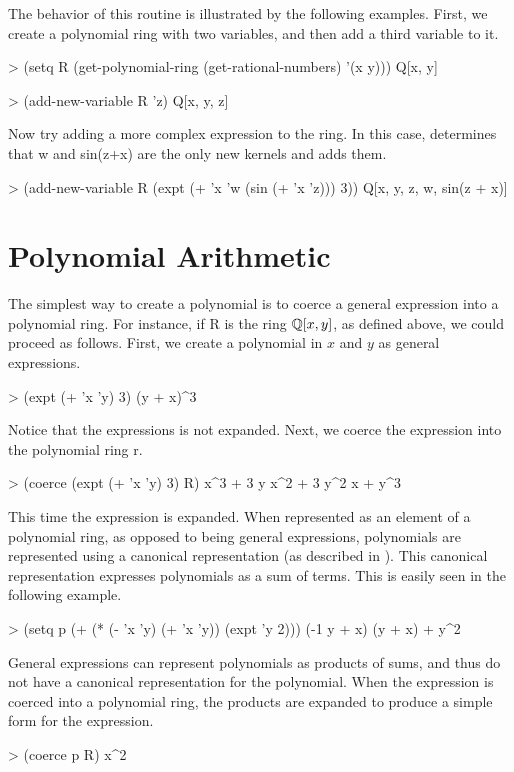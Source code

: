 The behavior of this routine is illustrated by the following examples.
First, we create a polynomial ring with two variables, and then add a
third variable to it.
\begin{code}  
> (setq R (get-polynomial-ring (get-rational-numbers) '(x y)))
Q[x, y]
  
> (add-new-variable R 'z)
Q[x, y, z]
\end{code}

\noindent
Now try adding a more complex expression to the ring.  In this case,
 determines that {\sf w} and {\sf sin(z+x)}
are the only new kernels and adds them.
\begin{code} 
> (add-new-variable R (expt (+ 'x 'w (sin (+ 'x 'z))) 3))
Q[x, y, z, w, sin(z + x)]
\end{code}

\section{Polynomial Arithmetic}
\label{Poly:Arith:Sec}
  
The simplest way to create a polynomial is to coerce a general
expression into a polynomial ring. For instance, if {\sf R} is the
ring ${\Bbb Q}[x, y]$,  as defined above, we could proceed as follows.  First,
we create a polynomial in $x$ and $y$ as general expressions.
\begin{code}
> (expt (+ 'x 'y) 3)
(y + x)^3
\end{code}
  
\noindent
Notice that the expressions is not expanded. Next, we coerce the
expression into the polynomial ring {\sf r}.
\begin{code}
> (coerce (expt (+ 'x 'y) 3) R)
x^3 + 3 y x^2 + 3 y^2 x + y^3
\end{code}
  
This time the expression is expanded. When represented as an element
of a polynomial ring, as opposed to being general expressions,
polynomials are represented using a canonical representation (as
described in ). This canonical
representation expresses polynomials as a sum of terms. This is easily
seen in the following example.
\begin{code}
> (setq p (+ (* (- 'x 'y) (+ 'x 'y)) (expt 'y 2)))
(-1 y + x) (y + x) + y^2
\end{code}

General expressions can represent polynomials as products of sums, and
thus do not have a canonical representation for the polynomial. When
the expression is coerced into a polynomial ring, the products are
expanded to produce a simple form for the expression.
\begin{code}  
> (coerce p R)
x^2
\end{code}


